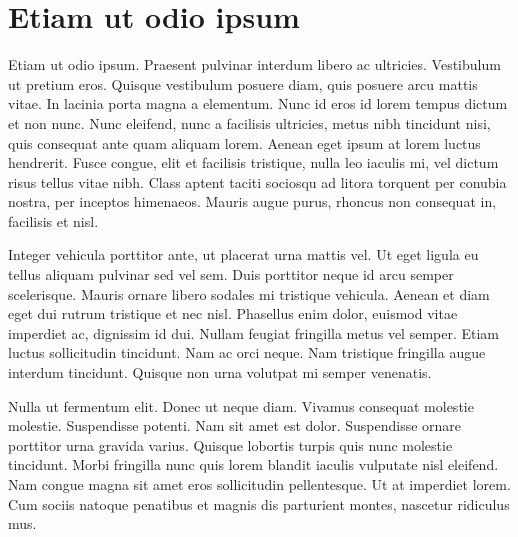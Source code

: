 \section*{Etiam ut odio ipsum}
Etiam ut odio ipsum.
Praesent pulvinar interdum libero ac ultricies.
Vestibulum ut pretium eros.
Quisque vestibulum posuere diam, quis posuere arcu mattis vitae.
In lacinia porta magna a elementum.
Nunc id eros id lorem tempus dictum et non nunc.
Nunc eleifend, nunc a facilisis ultricies, metus nibh tincidunt nisi, quis consequat ante quam aliquam lorem.
Aenean eget ipsum at lorem luctus hendrerit.
Fusce congue, elit et facilisis tristique, nulla leo iaculis mi, vel dictum risus tellus vitae nibh.
Class aptent taciti sociosqu ad litora torquent per conubia nostra, per inceptos himenaeos.
Mauris augue purus, rhoncus non consequat in, facilisis et nisl.

Integer vehicula porttitor ante, ut placerat urna mattis vel.
Ut eget ligula eu tellus aliquam pulvinar sed vel sem.
Duis porttitor neque id arcu semper scelerisque.
Mauris ornare libero sodales mi tristique vehicula.
Aenean et diam eget dui rutrum tristique et nec nisl.
Phasellus enim dolor, euismod vitae imperdiet ac, dignissim id dui.
Nullam feugiat fringilla metus vel semper.
Etiam luctus sollicitudin tincidunt.
Nam ac orci neque.
Nam tristique fringilla augue interdum tincidunt.
Quisque non urna volutpat mi semper venenatis.

Nulla ut fermentum elit.
Donec ut neque diam.
Vivamus consequat molestie molestie.
Suspendisse potenti.
Nam sit amet est dolor.
Suspendisse ornare porttitor urna gravida varius.
Quisque lobortis turpis quis nunc molestie tincidunt.
Morbi fringilla nunc quis lorem blandit iaculis vulputate nisl eleifend.
Nam congue magna sit amet eros sollicitudin pellentesque.
Ut at imperdiet lorem.
Cum sociis natoque penatibus et magnis dis parturient montes, nascetur ridiculus mus.